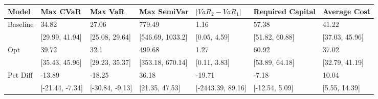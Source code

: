 \begin{tabular}{lllllll}
\toprule
   Model &        Max CVaR &         Max VaR &      Max SemiVar & $|VaR_2 - VaR_1|$ & Required Capital &   Average Cost \\
\midrule
Baseline &           34.82 &           27.06 &           779.49 &              1.16 &            57.38 &          41.22 \\
         &  [29.99, 41.94] &  [25.08, 29.64] & [546.69, 1033.2] &      [0.05, 4.59] &   [51.82, 60.88] & [37.03, 45.96] \\
     Opt &           39.72 &            32.1 &           499.68 &              1.27 &            60.92 &          37.02 \\
         &  [35.43, 45.96] &  [29.23, 35.37] & [353.18, 670.14] &      [0.11, 3.83] &   [53.89, 64.18] & [32.79, 41.19] \\
Pct Diff &          -13.89 &          -18.25 &            36.18 &            -19.71 &            -7.18 &          10.04 \\
         & [-21.44, -7.34] & [-30.84, -9.13] &   [21.35, 47.53] & [-2443.39, 89.16] &   [-12.54, 5.09] &  [5.55, 14.39] \\
\bottomrule
\end{tabular}
